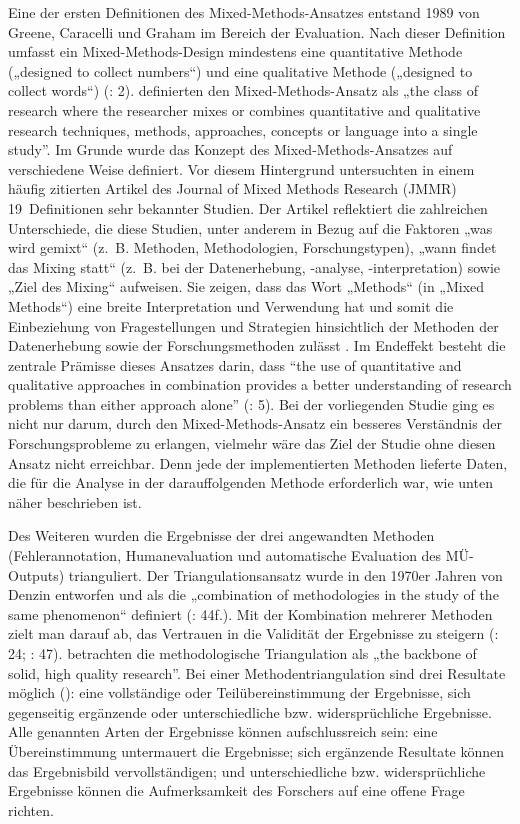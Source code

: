 Eine der ersten Definitionen des Mixed-Methods-Ansatzes entstand 1989 von Greene, Caracelli und Graham im Bereich der Evaluation. Nach dieser Definition umfasst ein Mixed-Methods-Design mindestens eine quantitative Methode („designed to collect numbers“) und eine qualitative Methode („designed to collect words“) (\citealt{CreswellClark2007}: 2). \citet{JohnsonOnwuegbuzie2004} definierten den Mixed-Methods-Ansatz als „the class of research where the researcher mixes or combines quantitative and qualitative research techniques, methods, approaches, concepts or language into a single study”. Im Grunde wurde das Konzept des Mixed-Methods-Ansatzes auf verschiedene Weise definiert. Vor diesem Hintergrund untersuchten \citet{JohnsonEtAl2007} in einem häufig zitierten Artikel des Journal of Mixed Methods Research (JMMR) 19~Definitionen sehr bekannter Studien. Der Artikel reflektiert die zahlreichen Unterschiede, die diese Studien, unter anderem in Bezug auf die Faktoren „was wird gemixt“ (z.~B. Methoden, Methodologien, Forschungstypen), „wann findet das Mixing statt“ (z.~B. bei der Datenerhebung, \nobreakdash-analyse, \nobreakdash-interpretation) sowie „Ziel des Mixing“ aufweisen. Sie zeigen, dass das Wort „Methods“ (in „Mixed Methods“) eine breite Interpretation und Verwendung hat und somit die Einbeziehung von Fragestellungen und Strategien hinsichtlich der Methoden der Datenerhebung sowie der Forschungsmethoden zulässt \citep{JohnsonEtAl2007}. Im Endeffekt besteht die zentrale Prämisse dieses Ansatzes darin, dass “the use of quantitative and qualitative approaches in combination provides a better understanding of research problems than either approach alone” (\citealt{CreswellClark2007}: 5). Bei der vorliegenden Studie ging es nicht nur darum, durch den Mixed-Methods-Ansatz ein besseres Verständnis der Forschungsprobleme zu erlangen, vielmehr wäre das Ziel der Studie ohne diesen Ansatz nicht erreichbar. Denn jede der implementierten Methoden lieferte Daten, die für die Analyse in der darauffolgenden Methode erforderlich war, wie unten näher beschrieben ist.

Des Weiteren wurden die Ergebnisse der drei angewandten Methoden (Fehlerannotation, Humanevaluation und automatische Evaluation des MÜ-Outputs) trianguliert. Der Triangulationsansatz wurde in den 1970er Jahren von Denzin entworfen und als die „combination of methodologies in the study of the same phenomenon“ definiert (\citealt{Kuckartz2014}: 44f.). Mit der Kombination mehrerer Methoden zielt man darauf ab, das Vertrauen in die Validität der Ergebnisse zu steigern (\citealt{FreyEtAl1991}: 24; \citealt{Kuckartz2014}: 47). \citet[23]{SaldanhaOBrien2014} betrachten die methodologische Triangulation als „the backbone of solid, high quality research”. Bei einer Methodentriangulation sind drei Resultate möglich (\citealt{ErzbergerKelle2003}): eine vollständige oder Teilübereinstimmung der Ergebnisse, sich gegenseitig ergänzende oder unterschiedliche bzw. widersprüchliche Ergebnisse. Alle genannten Arten der Ergebnisse können aufschlussreich sein: eine Übereinstimmung untermauert die Ergebnisse; sich ergänzende Resultate können das Ergebnisbild vervollständigen; und unterschiedliche bzw. widersprüchliche Ergebnisse können die Aufmerksamkeit des Forschers auf eine offene Frage richten.


